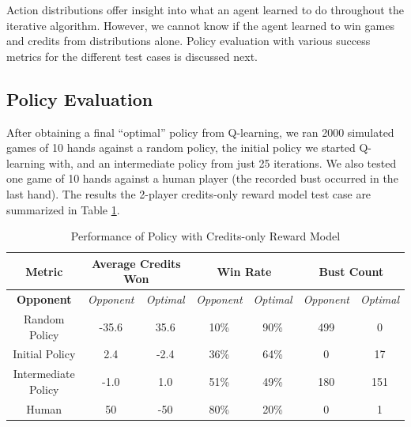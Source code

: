 \documentclass{article}
\begin{document}
Action distributions offer insight into what an agent learned to do throughout the iterative algorithm. However, we cannot know if the agent learned to win games and credits from distributions alone. Policy evaluation with various success metrics for the different test cases is discussed next.

\subsection{Policy Evaluation} %
After obtaining a final ``optimal'' policy from Q-learning, we ran 2000 simulated games of 10 hands against a random policy, the initial policy we started Q-learning with, and an intermediate policy from just 25 iterations. We also tested one game of 10 hands against a human player (the recorded bust occurred in the last hand). The results the 2-player credits-only reward model test case are summarized in Table \ref{tab:results1}.
\begin{table}[H]
\centering
\caption{Performance of Policy with Credits-only Reward Model}
\begin{tabular}{ c | c | c | c | c | c | c }
 \textbf{Metric} & \multicolumn{2}{|c|}{\textbf{Average Credits Won}} & \multicolumn{2}{|c|}{\textbf{Win Rate}} & \multicolumn{2}{|c}{\textbf{Bust Count}} \\ \hline 
 \textbf{Opponent}  & \textit{Opponent} & \textit{Optimal} & \textit{Opponent} & \textit{Optimal} & \textit{Opponent} & \textit{Optimal} \\ \hline
 Random Policy & -35.6 & 35.6 & 10\% & 90\% & 499 & 0\\
 Initial Policy & 2.4 & -2.4 & 36\% & 64\% & 0 & 17 \\
 Intermediate Policy & -1.0 & 1.0 & 51\% & 49\% & 180 & 151 \\
 Human  & 50 & -50 & 80\% & 20\% & 0 & 1 \\
\end{tabular}
\label{tab:results1}
\end{table}
\end{document}
